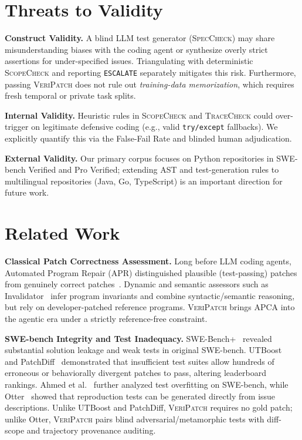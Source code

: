 \documentclass[conference]{IEEEtran}
\newcommand{\tool}{\textsc{VeriPatch}}
\newcommand{\speccheck}{\textsc{SpecCheck}}
\newcommand{\scopecheck}{\textsc{ScopeCheck}}
\newcommand{\tracecheck}{\textsc{TraceCheck}}
\begin{document}
\section{Threats to Validity}
\label{sec:threats}
\textbf{Construct Validity.} A blind LLM test generator (\speccheck{}) may share misunderstanding biases with the coding agent or synthesize overly strict assertions for under-specified issues. Triangulating with deterministic \scopecheck{} and reporting \texttt{ESCALATE} separately mitigates this risk. Furthermore, passing \tool{} does not rule out \emph{training-data memorization}, which requires fresh temporal or private task splits.

\textbf{Internal Validity.} Heuristic rules in \scopecheck{} and \tracecheck{} could over-trigger on legitimate defensive coding (e.g., valid \texttt{try/except} fallbacks). We explicitly quantify this via the False-Fail Rate and blinded human adjudication.

\textbf{External Validity.} Our primary corpus focuses on Python repositories in SWE-bench Verified and Pro Verified; extending AST and test-generation rules to multilingual repositories (Java, Go, TypeScript) is an important direction for future work.

\section{Related Work}
\label{sec:related}

\textbf{Classical Patch Correctness Assessment.}
Long before LLM coding agents, Automated Program Repair (APR) distinguished plausible (test-passing) patches from genuinely correct patches~\cite{fei2025apcasurvey}. Dynamic and semantic assessors such as Invalidator~\cite{lecong2023invalidator} infer program invariants and combine syntactic/semantic reasoning, but rely on developer-patched reference programs. \tool{} brings APCA into the agentic era under a strictly reference-free constraint.

\textbf{SWE-bench Integrity and Test Inadequacy.}
SWE-Bench+~\cite{aleithan2024swebenchplus} revealed substantial solution leakage and weak tests in original SWE-bench. UTBoost~\cite{yu2025utboost} and PatchDiff~\cite{wang2026patchdiff} demonstrated that insufficient test suites allow hundreds of erroneous or behaviorally divergent patches to pass, altering leaderboard rankings. Ahmed et al.~\cite{ahmed2025overfitting} further analyzed test overfitting on SWE-bench, while Otter~\cite{ahmed2025otter} showed that reproduction tests can be generated directly from issue descriptions. Unlike UTBoost and PatchDiff, \tool{} requires no gold patch; unlike Otter, \tool{} pairs blind adversarial/metamorphic tests with diff-scope and trajectory provenance auditing.
\end{document}

